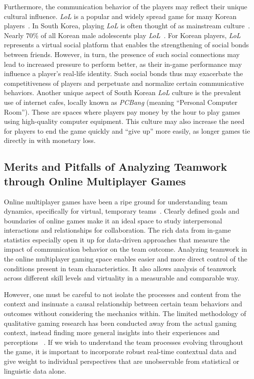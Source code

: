 Furthermore, the communication behavior of the players may reflect their unique cultural influence. \textit{LoL} is a popular and widely spread game for many Korean players~\cite{turbosmurfs}. In South Korea, playing \textit{LoL} is often thought of as mainstream culture~\cite{kukinews2019}. Nearly 70\% of all Korean male adolescents play \textit{LoL}~\cite{newsis2024}. For Korean players, \textit{LoL} represents a virtual social platform that enables the strengthening of social bonds between friends. However, in turn, the presence of such social connections may lead to increased pressure to perform better, as their in-game performance may influence a player's real-life identity. Such social bonds thus may exacerbate the competitiveness of players and perpetuate and normalize certain communicative behaviors. Another unique aspect of South Korean \textit{LoL} culture is the prevalent use of internet cafes, locally known as \textit{PCBang} (meaning ``Personal Computer Room''). These are spaces where players pay money by the hour to play games using high-quality computer equipment. This culture may also increase the need for players to end the game quickly and ``give up'' more easily, as longer games tie directly in with monetary loss.


\subsection{Merits and Pitfalls of Analyzing Teamwork through Online Multiplayer Games}

Online multiplayer games have been a ripe ground for understanding team dynamics, specifically for virtual, temporary teams~\cite{kou2014, kwak2015exploring, tan2022}. Clearly defined goals and boundaries of online games make it an ideal space to study interpersonal interactions and relationships for collaboration. The rich data from in-game statistics especially open it up for data-driven approaches that measure the impact of communication behavior on the team outcome. Analyzing teamwork in the online multiplayer gaming space enables easier and more direct control of the conditions present in team characteristics. It also allows analysis of teamwork across different skill levels and virtuality in a measurable and comparable way.

However, one must be careful to not isolate the processes and content from the context and insinuate a causal relationship between certain team behaviors and outcomes without considering the mechanics within. The limited methodology of qualitative gaming research has been conducted away from the actual gaming context, instead finding more general insights into their experiences and perceptions ~\cite{buchan2016, tan2021less}. If we wish to understand the team processes evolving throughout the game, it is important to incorporate robust real-time contextual data and give weight to individual perspectives that are unobservable from statistical or linguistic data alone.




